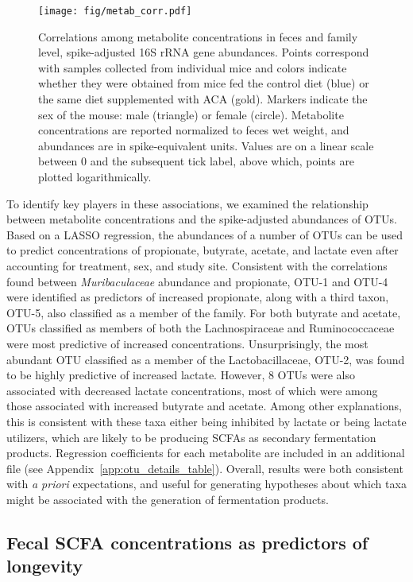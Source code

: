 \documentclass{doc/template/bmcart-nofigbox}
\newcommand{\frnlang}[1]{\textit{#1}}
\newcommand{\taxon}[1]{\frnlang{#1}}
\begin{document}
\begin{figure}[h!]
  \texttt{[image: fig/metab\_corr.pdf]}
  \caption{\label{fig:metab_corr}
  Correlations among metabolite concentrations in feces and family level,
  spike-adjusted 16S rRNA gene abundances.
  Points correspond with samples collected from individual mice and colors
  indicate whether they were obtained from mice fed the control diet
  (blue)
  or the same diet supplemented with ACA (gold).
  Markers indicate the sex of the mouse: male (triangle) or female (circle).
  Metabolite concentrations are reported normalized to feces wet weight, and
  abundances are in spike-equivalent units.
  Values are on a linear scale between 0 and the
  subsequent tick label, above which, points are plotted logarithmically.
  }
\end{figure}

To identify key players in these associations,
we examined the relationship between metabolite concentrations and the
spike-adjusted abundances of OTUs.
Based on a LASSO regression, the abundances of a number of OTUs can be used to
predict concentrations of
propionate, butyrate, acetate, and lactate even after accounting for treatment,
sex, and study site.
Consistent with the correlations found between \taxon{Muribaculaceae} abundance and
propionate, OTU-1 and OTU-4 were identified as predictors of increased
propionate, along with a third taxon, OTU-5, also classified as a member of the
family.
For both butyrate and acetate,
OTUs classified as members of both the Lachnospiraceae
and Ruminococcaceae were most predictive of increased concentrations.
Unsurprisingly, the most abundant OTU classified as a member of the
Lactobacillaceae, OTU-2, was found to be highly predictive of increased
lactate.
However, 8 OTUs were also associated with decreased lactate
concentrations, most of which were among those associated with increased
butyrate and acetate.
Among other explanations, this is consistent with these taxa either being
inhibited by lactate or being lactate utilizers, which are likely to be
producing SCFAs as secondary fermentation products.
Regression coefficients
for each metabolite are included in an additional file (see Appendix~\ref{app:otu_details_table}).
Overall, results were both consistent with \frnlang{a priori} expectations, and
useful for generating hypotheses about which taxa might be associated with the
generation of fermentation products.

\subsection*{Fecal SCFA concentrations as predictors of longevity}
\end{document}
